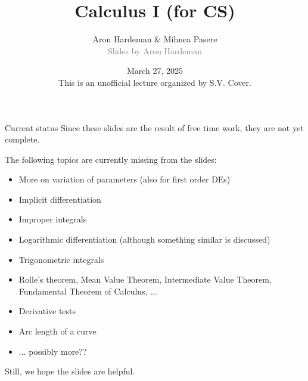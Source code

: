 \documentclass[
]{beamer}
\title{Calculus I (for CS)}
\author[Mihnea Pasere \& Aron Hardeman]{\texorpdfstring{Aron Hardeman \& Mihnea Pasere\\\textcolor{gray}{Slides by Aron Hardeman}}{Aron Hardeman}}
\date[March 27, 2025]{March 27, 2025\\This is an unofficial lecture organized by S.V. Cover.}
\begin{document}
\maketitle

\begin{frame}{Current status}
    Since these slides are the result of free time work, they are not yet complete.

    The following topics are currently missing from the slides:
    \begin{itemize}
        \pause\item More on variation of parameters (also for first order DEs)
        \pause\item Implicit differentiation
        \pause\item Improper integrals
        \pause\item Logarithmic differentiation (although something similar is discussed)
        \pause\item Trigonometric integrals
        \pause\item Rolle's theorem, Mean Value Theorem, Intermediate Value Theorem, Fundamental Theorem of Calculus, ...
        \pause\item Derivative tests
        \pause\item Arc length of a curve
        \pause\item ... possibly more??
    \end{itemize}
    Still, we hope the slides are helpful.
\end{frame}






\end{document}
